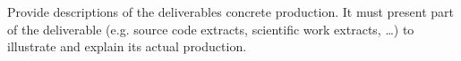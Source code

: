 {\color{gray}
Provide descriptions of the deliverables concrete production. It must
present part of the deliverable (e.g. source code extracts, scientific
work extracts, \ldots) to illustrate and explain its actual
production.
}
